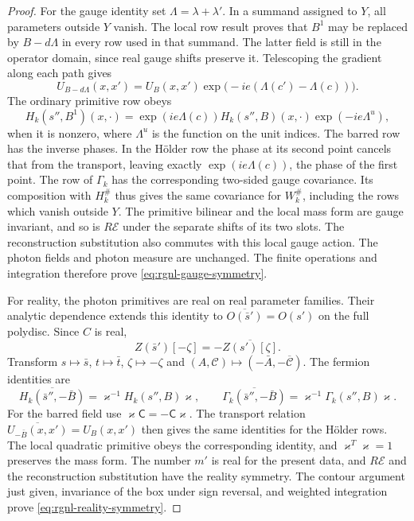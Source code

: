 \begin{proof}
For the gauge identity set $\Lambda=\lambda+\lambda'$.
In a summand assigned to $Y$, all parameters outside $Y$
vanish. The local row result proves that $B^1$ may be
replaced by $B-d\Lambda$ in every row used in that
summand. The latter field is still in the operator domain,
since real gauge shifts preserve it.
Telescoping the gradient along each path gives
\[
 U_{B-d\Lambda}(x,x')
       =U_B(x,x')\exp\big(-ie(\Lambda(c')-\Lambda(c))\big).
\]
The ordinary primitive row obeys
\[
 H_k(s'',B^1)(x,\cdot)
       =\exp(ie\Lambda(c))H_k(s'',B)(x,\cdot)
                                                 \exp(-ie\Lambda^u),
\]
when it is nonzero, where $\Lambda^u$ is the function
on the unit indices. The barred row has the inverse
phases. In the H\"older row the phase at its second
point cancels that from the transport, leaving exactly
$\exp(ie\Lambda(c))$, the phase of the first point.
The row of $\Gamma_k$ has the corresponding two-sided
gauge covariance. Its composition with $H_k^\#$ thus
gives the same covariance for $W_k^\#$, including the
rows which vanish outside $Y$.
The primitive bilinear and the local mass form are
gauge invariant, and so is $R\mathscr E$ under the
separate shifts of its two slots. The reconstruction
substitution also commutes with this local gauge action.
The photon fields and photon measure are unchanged.
The finite operations and integration therefore prove
\eqref{eq:rgnl-gauge-symmetry}.

For reality, the photon primitives are real on real
parameter families. Their analytic dependence extends
this identity to
$\overline{O(\bar s')}=O(s')$ on the full polydisc.
Since $C$ is real,
\[
 Z(\bar s')[-\zeta]=-\overline{Z(s')[\zeta]}.
\]
Transform $s\mapsto\bar s$, $t\mapsto\bar t$,
$\zeta\mapsto-\zeta$ and
$(A,\mathscr C)\mapsto(-\bar A,-\overline{\mathscr C})$.
The fermion identities are
\[
 \overline{H_k(\bar s'',-\bar B)}
                         =\varkappa^{-1}H_k(s'',B)\varkappa,\qquad
 \overline{\Gamma_k(\bar s'',-\bar B)}
                         =\varkappa^{-1}\Gamma_k(s'',B)\varkappa.
\]
For the barred field use
$\varkappa\mathsf C=-\mathsf C\varkappa$.
The transport relation
$\overline{U_{-\bar B}(x,x')}=U_B(x,x')$
then gives the same identities for the H\"older rows.
The local quadratic primitive obeys the corresponding
identity, and $\varkappa^T\varkappa=1$ preserves the
mass form. The number $m'$ is real for the present data,
and $R\mathscr E$ and the reconstruction substitution
have the reality symmetry. The contour argument just
given, invariance of the box under sign reversal, and
weighted integration prove
\eqref{eq:rgnl-reality-symmetry}.


\end{proof}
